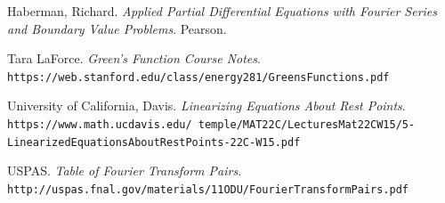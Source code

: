 \documentclass[12pt]{article}
\begin{document}
\begin{thebibliography}{9}

Haberman, Richard.
\textit{Applied Partial Differential Equations with Fourier Series and Boundary Value Problems}.
Pearson.

Tara LaForce.
\textit{Green's Function Course Notes}. \\
\texttt{https://web.stanford.edu/class/energy281/GreensFunctions.pdf}

University of California, Davis.
\textit{Linearizing Equations About Rest Points}. \\
\texttt{https://www.math.ucdavis.edu/~temple/MAT22C/LecturesMat22CW15/5-\\LinearizedEquationsAboutRestPoints-22C-W15.pdf}

USPAS.
\textit{Table of Fourier Transform Pairs}. \\\texttt{http://uspas.fnal.gov/materials/11ODU/FourierTransformPairs.pdf}

\end{thebibliography}
\end{document}
